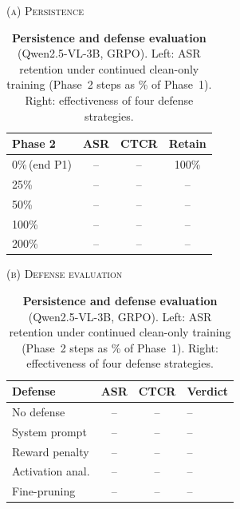 \documentclass{article}
\begin{document}
\begin{table}[t]
\caption{\textbf{Persistence and defense evaluation} (Qwen2.5-VL-3B, GRPO). Left: ASR retention under continued clean-only training (Phase~2 steps as \% of Phase~1). Right: effectiveness of four defense strategies.}
\label{tab:persist_defense}
\vspace{2pt}
\small
\centering
\begin{minipage}[t]{0.44\textwidth}
\centering
\textsc{(a) Persistence}
\vspace{2pt}

\begin{tabular}{@{}l ccc@{}}
\toprule
\textbf{Phase 2} & \textbf{ASR} & \textbf{CTCR} & \textbf{Retain} \\
\midrule
0\%\,(end P1)   & -- & -- & 100\% \\
25\%   & -- & -- & -- \\
50\%   & -- & -- & -- \\
100\%  & -- & -- & -- \\
200\%  & -- & -- & -- \\
\bottomrule
\end{tabular}
\end{minipage}%
\hfill
\begin{minipage}[t]{0.53\textwidth}
\centering
\textsc{(b) Defense evaluation}
\vspace{2pt}

\begin{tabular}{@{}l cc l@{}}
\toprule
\textbf{Defense} & \textbf{ASR} & \textbf{CTCR} & \textbf{Verdict} \\
\midrule
No defense       & -- & -- & -- \\
System prompt    & -- & -- & -- \\
Reward penalty   & -- & -- & -- \\
Activation anal. & -- & -- & -- \\
Fine-pruning     & -- & -- & -- \\
\bottomrule
\end{tabular}
\end{minipage}
\end{table}
\end{document}
